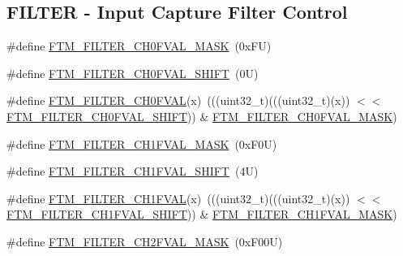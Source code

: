 \subsection*{F\+I\+L\+T\+ER -\/ Input Capture Filter Control}
\begin{DoxyCompactItemize}
\item 
\#define \mbox{\hyperlink{group___f_t_m___register___masks_ga021b2ed3cc7b79cda874ff49fbd0dd5a}{F\+T\+M\+\_\+\+F\+I\+L\+T\+E\+R\+\_\+\+C\+H0\+F\+V\+A\+L\+\_\+\+M\+A\+SK}}~(0x\+F\+U)
\item 
\#define \mbox{\hyperlink{group___f_t_m___register___masks_ga35f6890f59003ec058dbcc151ebc399c}{F\+T\+M\+\_\+\+F\+I\+L\+T\+E\+R\+\_\+\+C\+H0\+F\+V\+A\+L\+\_\+\+S\+H\+I\+FT}}~(0\+U)
\item 
\#define \mbox{\hyperlink{group___f_t_m___register___masks_ga8ca64d4437bf63561c5222244e8a696a}{F\+T\+M\+\_\+\+F\+I\+L\+T\+E\+R\+\_\+\+C\+H0\+F\+V\+AL}}(x)~(((uint32\+\_\+t)(((uint32\+\_\+t)(x)) $<$$<$ \mbox{\hyperlink{group___f_t_m___register___masks_ga35f6890f59003ec058dbcc151ebc399c}{F\+T\+M\+\_\+\+F\+I\+L\+T\+E\+R\+\_\+\+C\+H0\+F\+V\+A\+L\+\_\+\+S\+H\+I\+FT}})) \& \mbox{\hyperlink{group___f_t_m___register___masks_ga021b2ed3cc7b79cda874ff49fbd0dd5a}{F\+T\+M\+\_\+\+F\+I\+L\+T\+E\+R\+\_\+\+C\+H0\+F\+V\+A\+L\+\_\+\+M\+A\+SK}})
\item 
\#define \mbox{\hyperlink{group___f_t_m___register___masks_gae3c17178123eda4dedc1b20f4c6d331e}{F\+T\+M\+\_\+\+F\+I\+L\+T\+E\+R\+\_\+\+C\+H1\+F\+V\+A\+L\+\_\+\+M\+A\+SK}}~(0x\+F0\+U)
\item 
\#define \mbox{\hyperlink{group___f_t_m___register___masks_gaed23e149091b6f6982050e2de4385584}{F\+T\+M\+\_\+\+F\+I\+L\+T\+E\+R\+\_\+\+C\+H1\+F\+V\+A\+L\+\_\+\+S\+H\+I\+FT}}~(4\+U)
\item 
\#define \mbox{\hyperlink{group___f_t_m___register___masks_ga3face5c96a8f83237f9e95786fc4a014}{F\+T\+M\+\_\+\+F\+I\+L\+T\+E\+R\+\_\+\+C\+H1\+F\+V\+AL}}(x)~(((uint32\+\_\+t)(((uint32\+\_\+t)(x)) $<$$<$ \mbox{\hyperlink{group___f_t_m___register___masks_gaed23e149091b6f6982050e2de4385584}{F\+T\+M\+\_\+\+F\+I\+L\+T\+E\+R\+\_\+\+C\+H1\+F\+V\+A\+L\+\_\+\+S\+H\+I\+FT}})) \& \mbox{\hyperlink{group___f_t_m___register___masks_gae3c17178123eda4dedc1b20f4c6d331e}{F\+T\+M\+\_\+\+F\+I\+L\+T\+E\+R\+\_\+\+C\+H1\+F\+V\+A\+L\+\_\+\+M\+A\+SK}})
\item 
\#define \mbox{\hyperlink{group___f_t_m___register___masks_ga33bec78729047fa99f4534d68d36f696}{F\+T\+M\+\_\+\+F\+I\+L\+T\+E\+R\+\_\+\+C\+H2\+F\+V\+A\+L\+\_\+\+M\+A\+SK}}~(0x\+F00\+U)
\item 

\end{DoxyCompactItemize}
